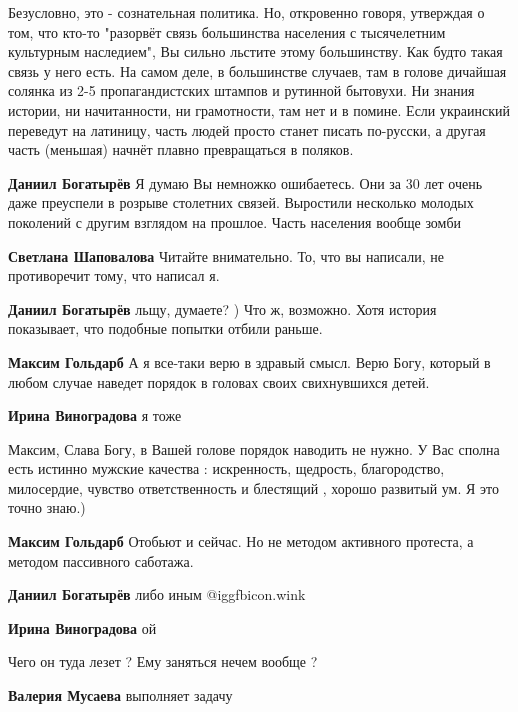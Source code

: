 \begin{itemize}

Безусловно, это - сознательная политика. Но, откровенно говоря, утверждая о
том, что кто-то "разорвёт связь большинства населения с тысячелетним культурным
наследием", Вы сильно льстите этому большинству. Как будто такая связь у него
есть. На самом деле, в большинстве случаев, там в голове дичайшая солянка из
2-5 пропагандистских штампов и рутинной бытовухи. Ни знания истории, ни
начитанности, ни грамотности, там нет и в помине. Если украинский переведут на
латиницу, часть людей просто станет писать по-русски, а другая часть (меньшая)
начнёт плавно превращаться в поляков.

\begin{itemize} %
\textbf{Даниил Богатырёв} Я думаю Вы немножко ошибаетесь. Они за 30 лет очень даже преуспели в розрыве столетних связей. Выростили несколько молодых поколений с другим взглядом на прошлое. Часть населения вообще зомби

\textbf{Светлана Шаповалова} Читайте внимательно. То, что вы написали, не противоречит тому, что написал я.

\textbf{Даниил Богатырёв} льщу, думаете? ) Что ж, возможно. Хотя история показывает, что подобные попытки отбили раньше.

\textbf{Максим Гольдарб} А я все-таки верю в здравый смысл. Верю Богу, который в любом случае наведет порядок в головах своих свихнувшихся детей.

\textbf{Ирина Виноградова} я тоже

Максим, Слава Богу, в Вашей голове порядок наводить не нужно. У Вас сполна есть истинно мужские качества : искренность, щедрость, благородство, милосердие, чувство ответственность и блестящий , хорошо развитый ум. Я это точно знаю.)

\textbf{Максим Гольдарб} Отобьют и сейчас. Но не методом активного протеста, а методом пассивного саботажа.

\textbf{Даниил Богатырёв} либо иным  @igg{fbicon.wink} 

\textbf{Ирина Виноградова} ой

\end{itemize} %

Чего он туда лезет ? Ему заняться нечем вообще ?

\begin{itemize} %
\textbf{Валерия Мусаева} выполняет задачу


\end{itemize}
\end{itemize}
